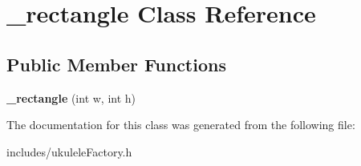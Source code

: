 \hypertarget{class__rectangle}{}\section{\+\_\+rectangle Class Reference}
\label{class__rectangle}
\subsection*{Public Member Functions}
\begin{DoxyCompactItemize}
\item 
\hypertarget{class__rectangle_a90654bc64a4eef9877f1530aadc342b3}{}\label{class__rectangle_a90654bc64a4eef9877f1530aadc342b3} 
{\bfseries \+\_\+rectangle} (int w, int h)
\end{DoxyCompactItemize}


The documentation for this class was generated from the following file\+:\begin{DoxyCompactItemize}
\item 
includes/ukulele\+Factory.\+h\end{DoxyCompactItemize}
